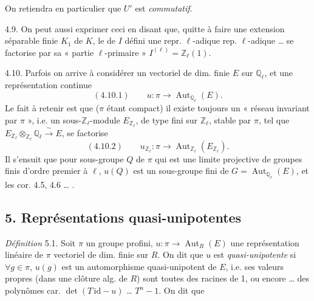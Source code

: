 \documentclass[11pt,a4paper]{article}
\begin{document}
On retiendra en particulier que $U'$ est \emph{commutatif}.

4.9. On peut aussi exprimer ceci en disant que, quitte à faire une extension séparable finie $K_1$ de $K$, \ill{} le  de $I$ défini  une repr. $\ell$-adique  rep. $\ell$-adique \ldots{} se factorise par sa « partie $\ell$-primaire » $I^{(\ell)} = \mathbb{Z}_\ell(1)$.

4.10. Parfois on arrive à considérer un vectoriel de dim. finie $E$ sur $\mathbb{Q}_\ell$, et une représentation continue
\[
  (4.10.1) \qquad u : \pi \longrightarrow \operatorname{Aut}_{\mathbb{Q}_\ell}(E) .
\]
Le fait à retenir est que ($\pi$ étant compact) il existe toujours un « réseau invariant par $\pi$ », i.e. un sous-$\mathbb{Z}_\ell$-module $E_{\mathbb{Z}_\ell}$,   de type fini sur $\mathbb{Z}_\ell$, stable par $\pi$, tel que $E_{\mathbb{Z}_\ell} \otimes_{\mathbb{Z}_\ell} \mathbb{Q}_\ell \xrightarrow{\ \sim\ } E$,   se factorise 
\[
  (4.10.2) \qquad u_{\mathbb{Z}_\ell} : \pi \longrightarrow \operatorname{Aut}_{\mathbb{Z}_\ell}(E_{\mathbb{Z}_\ell}) .
\]
Il s'ensuit  que pour  sous-groupe $Q$ de $\pi$ qui est une limite projective de groupes finis d'ordre premier à $\ell$, $u(Q)$ est un sous-groupe fini de $G = \operatorname{Aut}_{\mathbb{Q}_\ell}(E)$, et les cor. 4.5,  4.6 \ldots{}  .

\subsection*{5. Représentations quasi-unipotentes}

\emph{Définition} 5.1. Soit $\pi$ un groupe profini, $u : \pi \to \operatorname{Aut}_R(E)$ une représentation linéaire de $\pi$   vectoriel de dim. finie sur  $R$. On dit que $u$ est \struck{\ill{}} \emph{quasi-unipotente} si $\forall g \in \pi$, $u(g)$ est un automorphisme quasi-unipotent de $E$, i.e. ses valeurs propres (dans une clôture alg. de $R$) sont toutes des racines de 1, ou encore  \ldots{} des polynômes car. $\det(T\,\mathrm{id} - u)$ \ldots{} $T^{n} - 1$. On dit que
\end{document}
